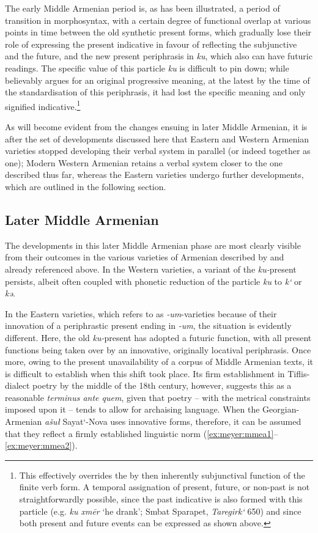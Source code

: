\documentclass[output=paper,colorlinks,citecolor=brown]{langscibook}
\begin{document}
	The early Middle Armenian period is, as has been illustrated, a period of transition in morphosyntax, with a certain degree of functional overlap at various points in time between the old synthetic present forms, which gradually lose their role of expressing the present indicative in favour of reflecting the subjunctive and the future, and the new present periphrasis in \textit{ku}, which also can have futuric readings. The specific value of this particle \textit{ku} is difficult to pin down; while \citet[137]{Vaux1995} believably argues for an original progressive meaning, at the latest by the time of the standardisation of this periphrasis, it had lost the specific meaning and only signified indicative.\footnote{This effectively overrides the by then inherently subjunctival function of the finite verb form. A temporal assignation of present, future, or non-past is not straightforwardly possible, since the past indicative is also formed with this particle (e.g. \textit{ku xmēr} ‘he drank’; Smbat Sparapet, \textit{Taregirk‘} 650) and since both present and future events can be expressed as shown above.}
	
	As will become evident from the changes ensuing in later Middle Armenian, it is after the set of developments discussed here that Eastern and Western Armenian varieties stopped developing their verbal system in parallel (or indeed together as one); Modern Western Armenian retains a verbal system closer to the one described thus far, whereas the Eastern varieties undergo further developments, which are outlined in the following section.
	
	\subsection{Later Middle Armenian}
	The developments in this later Middle Armenian phase are most clearly visible from their outcomes in the various varieties of Armenian described by \citet{Acarean1911} and already referenced above. In the Western varieties, a variant of the \textit{ku-}present persists, albeit often coupled with phonetic reduction of the particle \textit{ku} to \textit{k‘} or \textit{kə}.
	
	In the Eastern varieties, which \citet{Acarean1911} refers to as \textit{-um}-varieties because of their innovation of a periphrastic present ending in \textit{-um}, the situation is evidently different. Here, the old \textit{ku-}present has adopted a futuric function, with all present functions being taken over by an innovative, originally locatival periphrasis. Once more, owing to the present unavailability of a corpus of Middle Armenian texts, it is difficult to establish when this shift took place. Its firm establishment in Tiflis-dialect poetry by the middle of the 18th century, however, suggests this as a reasonable \textit{terminus ante quem}, given that poetry – with the metrical constraints imposed upon it – tends to allow for archaising language. When the Georgian-Armenian \textit{ašuł} Sayat‘-Nova uses innovative forms, therefore, it can be assumed that they reflect a firmly established linguistic norm (\ref{ex:meyer:mmea1}–\ref{ex:meyer:mmea2}).
	
\end{document}
